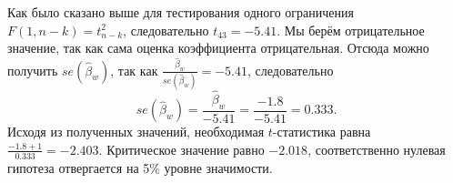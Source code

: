 \documentclass[addpoints, answers]{exam} %
\begin{document}
\begin{questions}
\begin{solution}
Как было сказано выше для тестирования одного ограничения $F(1,n-k)=t_{n-k}^{2} $, следовательно $t_{43} =-5.41$. Мы берём отрицательное значение, так как сама оценка коэффициента отрицательная. Отсюда можно получить $se(\hat{\beta }_{w} )$, так как $\frac{\hat{\beta }_{w} }{se(\hat{\beta }_{w} )} =-5.41$, следовательно
\[
se(\hat{\beta }_{w} )=\frac{\hat{\beta }_{w} }{-5.41} =\frac{-1.8}{-5.41} =0.333.
\]
Исходя из полученных значений, необходимая $t$-статистика равна $\frac{-1.8+1}{0.333} =-2.403$. Критическое значение равно  $-2.018$, соответственно нулевая гипотеза отвергается на 5\% уровне значимости.
\end{solution}




\end{questions}
\end{document}
